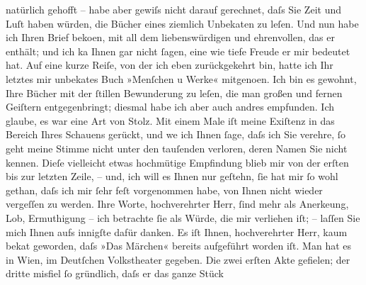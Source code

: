 \begin{ledgroupsized}[t]{13cm}
                    natürlich gehofft – habe aber gewiſs nicht darauf gerechnet, daſs Sie Zeit und
                    Luſt haben würden, die Bücher eines ziemlich Unbeka{\geminationn}ten zu leſen. Und nun habe ich Ihren Brief beko{\geminationm}en, mit all dem liebens{\pb}würdigen und
                    ehrenvollen, das er enthält; und ich ka{\geminationn} Ihnen gar
                    nicht ſagen, eine wie tiefe Freude er mir bedeutet hat. Auf eine kurze Reiſe,
                    von der ich eben zurückgekehrt bin, hatte ich Ihr letztes mir unbeka{\geminationn}tes Buch »Menſchen u
                        Werke« mitgeno{\geminationm}en. Ich bin es
                    gewohnt, Ihre Bücher mit der ſtillen Bewunderung zu leſen, die man großen und
                    fernen Geiſtern entgegen{\pb}bringt; diesmal
                    habe ich aber auch andres empfunden. Ich glaube, es war eine Art von Stolz. Mit
                    einem Male iſt meine Exiſtenz in das Bereich Ihres Schauens gerückt, und we{\geminationn} ich Ihnen ſage, daſs ich Sie verehre, ſo geht
                    meine Stimme nicht unter den tauſenden verloren, deren Namen Sie nicht kennen.
                    Dieſe vielleicht etwas hochmütige Empfindung blieb mir {\pb}von der erſten bis zur letzten Zeile, –
                    und, ich will es Ihnen nur geſtehn, ſie hat mir ſo wohl gethan, daſs ich mir
                    ſehr feſt vorgenommen habe, von Ihnen nicht wieder vergeſſen zu werden. Ihre
                    Worte, hochverehrter Herr, ſind mehr als Anerke{\geminationn}ung, Lob, Ermuthigung – ich betrachte ſie als Würde, die mir verliehen iſt; –
                    laſſen Sie mich Ihnen aufs innigſte dafür {\pb}danken.\pend
           \pstart
           Es iſt Ihnen, hochverehrter Herr, kaum beka{\geminationn}t
                    geworden, daſs »Das Märchen« bereits
                    aufgeführt worden iſt. Man hat es in Wien, im
                        Deutſchen Volkstheater gegeben. Die zwei
                    erſten Akte gefielen; der dritte misfiel ſo gründlich, daſs er das ganze Stück

\end{ledgroupsized}
